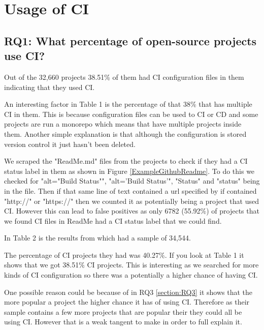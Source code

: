 \documentclass[twoside,12pt,titlepage,a4paper]{article}
\begin{document}
\pagebreak
\section{Usage of CI}

\vspace*{-0.05in}
\subsection{\textbf{RQ1}: What percentage of open-source projects use CI?}
\label{section:RQ1}
\vspace*{-0.05in}

Out of the 32,660 projects 38.51\% of them had CI configuration files in them indicating that they used CI. 



An interesting factor in Table 1 is the percentage of that 38\% that has multiple CI in them. This is because configuration files can be used to CI or CD and some projects are run a monorepo which means that have multiple projects inside them. Another simple explanation is that although the configuration is stored version control it just hasn't been deleted. 


We scraped the "ReadMe.md" files from the projects to check if they had a CI status label in them as shown in Figure \ref{ExampleGithubReadme}. To do this we checked for "alt="Build Status"", "alt='Build Status'", "Status" and "status" being in the file. Then if that same line of text contained a url specified by if contained "http://" or "https://" then we counted it as potentially being a project that used CI. However this can lead to false positives as only 6782 (55.92\%) of projects that we found CI files in ReadMe had a CI status label that we could find.

In Table 2 is the results from \citet{Hilton2016} which had a sample of 34,544.


The percentage of CI projects they had was 40.27\%. If you look at Table 1 it shows that we got 38.51\% CI projects. This is interesting as we searched for more kinds of CI configuration so there was a potentially a higher chance of having CI.

One possible reason could be because of in RQ3 \ref{section:RQ3} it shows that the more popular a project the higher chance it has of using CI. Therefore as their sample contains a few more projects that are popular their they could all be using CI. However that is a weak tangent to make in order to full explain it.  
\end{document}
